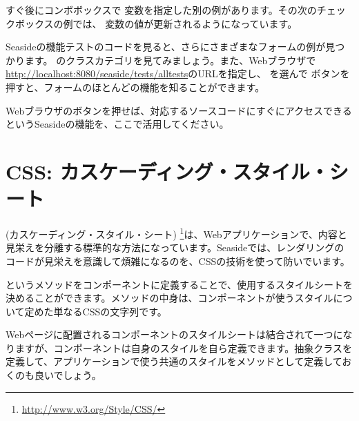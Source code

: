 \documentclass[a4paper,10pt,twoside]{book}
\begin{document}
すぐ後にコンボボックスで 変数を指定した別の例があります。その次のチェックボックスの例では、  変数の値が更新されるようになっています。

Seasideの機能テストのコードを見ると、さらにさまざまなフォームの例が見つかります。
 のクラスカテゴリを見てみましょう。また、Webブラウザで\url{http://localhost:8080/seaside/tests/alltests}のURLを指定し、
 を選んで  ボタンを押すと、フォームのほとんどの機能を知ることができます。

Webブラウザのボタンを押せば、対応するソースコードにすぐにアクセスできるというSeasideの機能を、ここで活用してください。

\section{CSS: カスケーディング・スタイル・シート}


(カスケーディング・スタイル・シート) \footnote{\url{http://www.w3.org/Style/CSS/}}は、Webアプリケーションで、内容と見栄えを分離する標準的な方法になっています。Seasideでは、レンダリングのコードが見栄えを意識して煩雑になるのを、CSSの技術を使って防いでいます。

 というメソッドをコンポーネントに定義することで、使用するスタイルシートを決めることができます。メソッドの中身は、コンポーネントが使うスタイルについて定めた単なるCSSの文字列です。

Webページに配置されるコンポーネントのスタイルシートは結合されて一つになりますが、コンポーネントは自身のスタイルを自ら定義できます。抽象クラスを定義して、アプリケーションで使う共通のスタイルをメソッドとして定義しておくのも良いでしょう。
\end{document}
